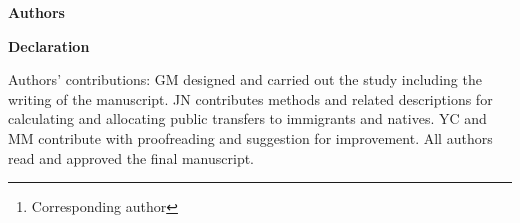 \documentclass[12pt,a4paper]{article}
\begin{document}
\begin{titlepage}

  \title{\articleTwoTitle}
  \author{}
  \date{}
  \maketitle


\textbf{\LARGE Authors}
  \vspace{0.7em}\par
  \author{
    \noindent
    Gilbert MONTCHO\footnote{Corresponding author} \href{https://orcid.org/0000-0003-1845-4679}{} \\
    Department of Demography, University of Montreal\\
    gilbert.montcho@umontreal.ca

    \vspace{0.7em}\par
    \noindent
    Julien Navaux \\
    Research Chair in Intergenerational Economics, HEC Montreal \\
    julien.navaux@hec.ca

    \vspace{0.7em}\par
    \noindent
    Yves CARRIERE \\
    Department of Demography, University of Montreal \\
    yves.carriere@umontreal.ca

    \vspace{0.7em}\par
    \noindent
    Marcel MERETTE\\
    Department of Economics, University of Ottawa\\
    mmerette@uottawa.ca
  }

  \vspace{3cm}


\newpage
\textbf{\LARGE Declaration}

  \vspace{0.7em}\par
  \noindent
  Authors' contributions: GM designed and carried out the study including the writing of the manuscript. JN contributes methods and related descriptions for calculating and allocating public transfers to immigrants and natives. YC and MM contribute with proofreading and suggestion for improvement. All authors read and approved the final manuscript.


\end{titlepage}
\end{document}
